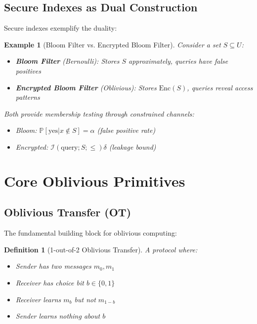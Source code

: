 \documentclass[11pt,final,hidelinks]{article}
\newtheorem{definition}[theorem]{Definition}
\newtheorem{example}[theorem]{Example}
\newcommand{\MutualInfo}[2]{\mathcal{I}(#1; #2)}
\newcommand{\Prob}[1]{\mathbb{P}\left[#1\right]}
\begin{document}
\subsection{Secure Indexes as Dual Construction}

Secure indexes exemplify the duality:

\begin{example}[Bloom Filter vs. Encrypted Bloom Filter]
Consider a set $S \subseteq U$:
\begin{itemize}
    \item \textbf{Bloom Filter} (Bernoulli): Stores $S$ approximately, queries have false positives
    \item \textbf{Encrypted Bloom Filter} (Oblivious): Stores $\text{Enc}(S)$, queries reveal access patterns
\end{itemize}

Both provide membership testing through constrained channels:
\begin{itemize}
    \item Bloom: $\Prob{\text{yes}|x \notin S} = \alpha$ (false positive rate)
    \item Encrypted: $\MutualInfo{\text{query}; S} \leq \delta$ (leakage bound)
\end{itemize}
\end{example}

\section{Core Oblivious Primitives}

\subsection{Oblivious Transfer (OT)}

The fundamental building block for oblivious computing:

\begin{definition}[1-out-of-2 Oblivious Transfer]
A protocol where:
\begin{itemize}
    \item Sender has two messages $m_0, m_1$
    \item Receiver has choice bit $b \in \{0,1\}$
    \item Receiver learns $m_b$ but not $m_{1-b}$
    \item Sender learns nothing about $b$
\end{itemize}
\end{definition}
\end{document}
